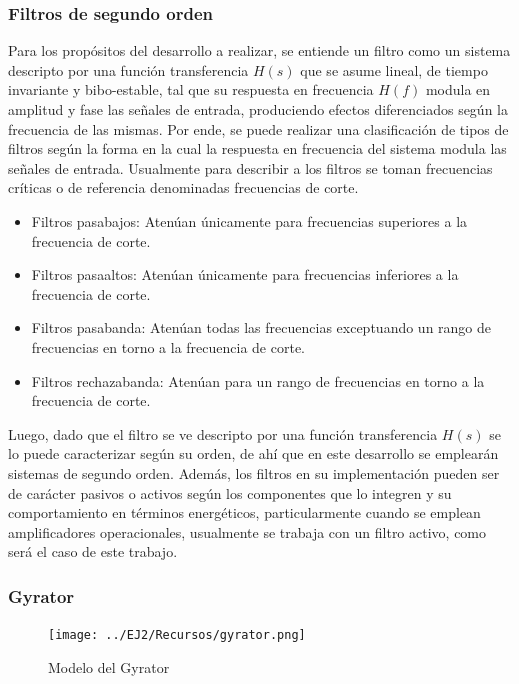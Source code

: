 \subsubsection{Filtros de segundo orden}
Para los prop\'ositos del desarrollo a realizar, se entiende un filtro como un sistema descripto por una funci\'on transferencia $H(s)$ que se asume lineal, de tiempo invariante
y bibo-estable, tal que su respuesta en frecuencia $H(f)$ modula en amplitud y fase las se\~nales de entrada, produciendo efectos diferenciados seg\'un la frecuencia de las mismas. Por ende,
se puede realizar una clasificaci\'on de tipos de filtros seg\'un la forma en la cual la respuesta en frecuencia del sistema modula las se\~nales de entrada. Usualmente para describir a los filtros se toman
frecuencias cr\'iticas o de referencia denominadas frecuencias de corte.

\begin{itemize}
    \item Filtros pasabajos: Aten\'uan \'unicamente para frecuencias superiores a la frecuencia de corte.
    \item Filtros pasaaltos: Aten\'uan \'unicamente para frecuencias inferiores a la frecuencia de corte.
    \item Filtros pasabanda: Aten\'uan todas las frecuencias exceptuando un rango de frecuencias en torno a la frecuencia de corte.
    \item Filtros rechazabanda: Aten\'uan para un rango de frecuencias en torno a la frecuencia de corte.
\end{itemize}

Luego, dado que el filtro se ve descripto por una funci\'on transferencia $H(s)$ se lo puede caracterizar seg\'un su orden, de ah\'i que en este desarrollo se emplear\'an sistemas de segundo orden.
Adem\'as, los filtros en su implementaci\'on pueden ser de car\'acter pasivos o activos seg\'un los componentes que lo integren y su comportamiento en t\'erminos energ\'eticos, particularmente cuando se emplean
amplificadores operacionales, usualmente se trabaja con un filtro activo, como ser\'a el caso de este trabajo.

\subsubsection{Gyrator}

\begin{figure}[H]
    \centering
    \texttt{[image: ../EJ2/Recursos/gyrator.png]}
    \caption{Modelo del Gyrator}
    \label{fig:gyrator_modelo}
\end{figure}

